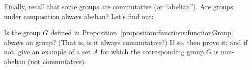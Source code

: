 Finally, recall that some groups are commutative (or ``abelian''). Are groups under composition always abelian? Let's find out:

\begin{exercise}{}
Is the group $G$ defined in Proposition~\ref{proposition:functions:functionGroup} always an  group? (That is, is it always commutative?)  If so, then prove it; and if not, give an example of a set $A$ for which the corresponding group $G$ is non-abelian (not commutative). 
\end{exercise}
  
%
